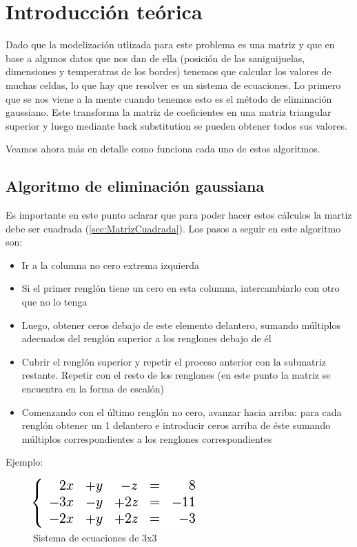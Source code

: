 \section{Introducci\'on te\'orica}

Dado que la modelización utlizada para este problema es una matriz y que en base a algunos datos que nos dan de ella (posición de las saniguijuelas, dimensiones y temperatras de los bordes) tenemos que calcular los valores de muchas celdas, lo que hay que resolver es un sistema de ecuaciones. 
Lo primero que se nos viene a la mente cuando tenemos esto es el método de eliminación gaussiano. Este transforma la matriz de coeficientes en una matriz triangular superior y luego mediante back substitution se pueden obtener todos sus valores.

Veamos ahora más en detalle como funciona cada uno de estos algoritmos.

\subsection{Algoritmo de eliminación gaussiana}
Es importante en este punto aclarar que para poder hacer estos cálculos la martiz debe ser cuadrada (\ref{sec:MatrizCuadrada}).
Los pasos a seguir en este algoritmo son:

\begin{itemize}

\item Ir a la columna no cero extrema izquierda
\item Si el primer renglón tiene un cero en esta columna, intercambiarlo con otro que no lo tenga
\item Luego, obtener ceros debajo de este elemento delantero, sumando múltiplos adecuados del renglón superior a los renglones debajo de él
\item Cubrir el renglón superior y repetir el proceso anterior con la submatriz restante. Repetir con el resto de los renglones (en este punto la matriz se encuentra en la forma de escalón)
\item Comenzando con el último renglón no cero, avanzar hacia arriba: para cada renglón obtener un 1 delantero e introducir ceros arriba de éste sumando múltiplos 
correspondientes a los renglones correspondientes

\end{itemize}
 
Ejemplo:

\begin{figure}[htb]
\begin{center}
\includegraphics[scale=0.70]{imagenes/ejemplo_gaus_1.png} 
\caption{Sistema de ecuaciones de 3x3} 
\end{center}
\end{figure}

